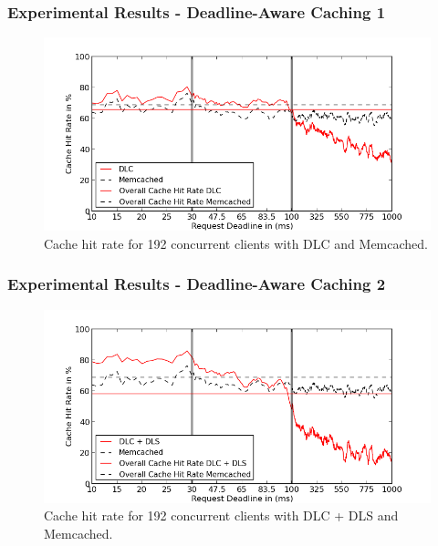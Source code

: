 \documentclass{beamer}
\begin{document}
\begin{frame}
\frametitle{Experimental Results - Deadline-Aware Caching 1}
\begin{figure}[t]
\begin{center}
\centerline{\includegraphics[scale=0.5]{img/EC2/EC2_CS_MM/cache_48.png}}
\caption{Cache hit rate for 192 concurrent clients with DLC and Memcached.}
\label{fig:cache_192_cs_mm}
\end{center}
\end{figure}
\end{frame}

\begin{frame}
\frametitle{Experimental Results - Deadline-Aware Caching 2}
\begin{figure}[t]
\begin{center}
\centerline{\includegraphics[scale=0.5]{img/EC2/EC2_SH_MM/cache_48.png}}
\caption{Cache hit rate for 192 concurrent clients with DLC + DLS and Memcached.}
\label{fig:cache_192_sh_mm}
\end{center}
\end{figure}
\end{frame}
\end{document}
